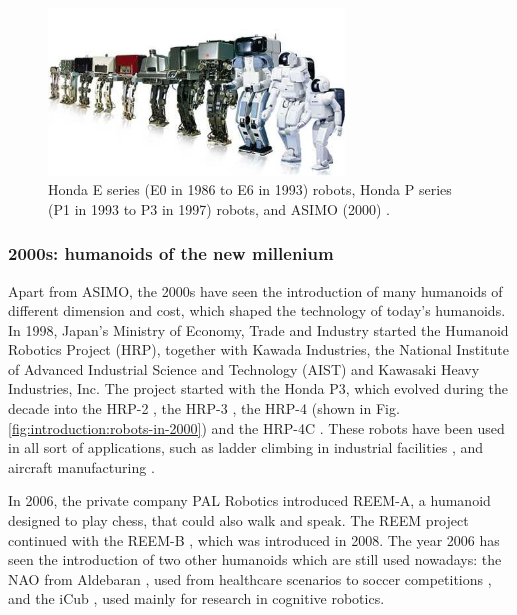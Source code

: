 \begin{figure}
    \centering
    \includegraphics[width=0.7\textwidth]{figures/01-introduction/The-ASIMO-humanoid-robot-history.png}
    \caption{Honda E series (E0 in 1986 to E6 in 1993) robots, Honda P series (P1 in
        1993 to P3 in 1997) robots, and ASIMO (2000)
        \cite{Shigemi2019ASIMOandHumanoidRobotResearchatHonda}.}
    \label{fig:introduction:ASIMO-humanoid-history}
\end{figure}

\subsubsection{2000s: humanoids of the new millenium}
Apart from ASIMO, the 2000s have seen the introduction of many humanoids of 
different dimension and cost, which shaped the technology of today's humanoids.
In 1998, Japan's Ministry of Economy, Trade and Industry started the Humanoid
Robotics Project (HRP), together with Kawada Industries, the National
Institute of Advanced Industrial Science and Technology (AIST) and Kawasaki
Heavy Industries, Inc. The project started with the Honda P3, which evolved 
during the decade into the HRP-2 \cite{Kaneko2004HRP2}, the HRP-3
\cite{Kaneko2008HRP3}, the HRP-4 \cite{Kaneko2011HRP4} (shown in Fig.
\ref{fig:introduction:robots-in-2000}) and the HRP-4C
\cite{Kaneko2009HRP4C}. These robots have been used in all sort of applications,
such as ladder climbing in industrial facilities \cite{Vaillant2016AuRo}, and aircraft manufacturing
\cite{Kheddar2019AircraftManufacturing}.

In 2006, the private company PAL Robotics introduced REEM-A, a humanoid designed to 
play chess, that could also walk and speak. The REEM project continued with 
the REEM-B \cite{Tellez2008REEMB}, which was introduced in 2008. The year 2006 
has seen the introduction of two other humanoids which are still used nowadays:
the NAO from Aldebaran \cite{Gouaillier2008NAOHumanoid}, used from healthcare
scenarios \cite{Cifuentes2020SocialRI} to soccer competitions \cite{Kitano1997RoboCupTR},
and the iCub \cite{Metta2010iCubHumanoid}, used mainly for research in 
cognitive robotics.

